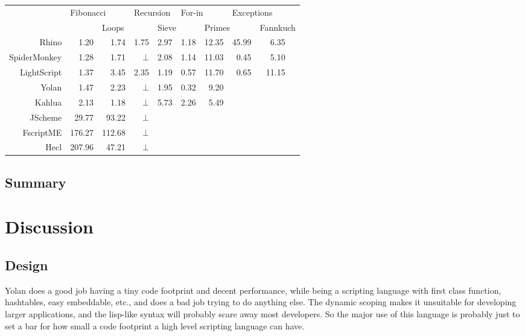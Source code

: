 \documentclass[11pt]{report}
\begin{document}
\begin{center} \begin{tabular}{|r|r|r|r|r|r|r|r|rr|} \hline 
& \multicolumn{2}{|l|}{Fibonacci} & \multicolumn{2}{|l|}{Recursion} & \multicolumn{2}{|l|}{For-in} & \multicolumn{2}{|l}{Exceptions} & \\
& & \multicolumn{2}{|l|}{Loops} & \multicolumn{2}{|l|}{Sieve} & \multicolumn{2}{|l|}{Primes} & \multicolumn{2}{|l|}{Fannkuch} \\
\hline Rhino       & 1.20 & 1.74 & 1.75   & 2.97 & 1.18 & 12.35 & 45.99 & 6.35 & \\ 
\hline SpiderMonkey& 1.28 & 1.71 & $\bot$ & 2.08 & 1.14 & 11.03 & 0.45  & 5.10 & \\ 
\hline LightScript & 1.37 & 3.45 & 2.35   & 1.19 & 0.57 & 11.70 & 0.65  & 11.15 & \\
\hline Yolan       & 1.47 & 2.23 & $\bot$ & 1.95 & 0.32 &  9.20 &  &  & \\
\hline Kahlua      & 2.13 & 1.18 & $\bot$ &  5.73 & 2.26 & 5.49 &  &  & \\ 
\hline JScheme    & 29.77 & 93.22 & $\bot$ & & & & & & \\ 
\hline FscriptME & 176.27 & 112.68& $\bot$ & & & & & & \\ 
\hline Hecl      & 207.96 & 47.21 & $\bot$ & & & & & & \\ 
\hline \end{tabular}
\end{center} 

\section{Summary}
\chapter{Discussion}
\label{discussion}

\section{Design}

Yolan does a good job having a tiny code footprint and decent performance, while being a scripting language with first class function, hashtables, easy embeddable, etc., and does a bad job trying to do anything else.
The dynamic scoping makes it unsuitable for developing larger applications, and the lisp-like syntax will probably scare away most developers.
So the major use of this language is probably just to set a bar for how small a code footprint a high level scripting language can have.
\end{document}
